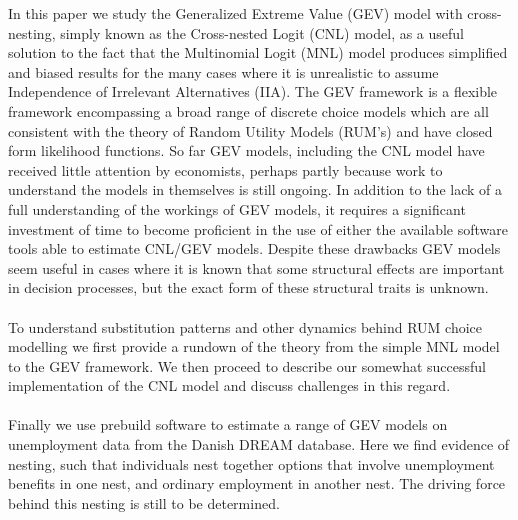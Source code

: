 In this paper we study the Generalized Extreme Value (GEV) model with cross-nesting, simply known as the Cross-nested Logit (CNL) model, as a useful solution to the fact that the Multinomial Logit (MNL) model produces simplified and biased results for the many cases where it is unrealistic to assume Independence of Irrelevant Alternatives (IIA). The GEV framework is a flexible framework encompassing a broad range of discrete choice models which are all consistent with the theory of Random Utility Models (RUM's) and have closed form likelihood functions. So far GEV models, including the CNL model have received little attention by economists, perhaps partly because work to understand the models in themselves is still ongoing. In addition to the lack of a full understanding of the workings of GEV models, it requires a significant investment of time to become proficient in the use of either the available software tools able to estimate CNL/GEV models. Despite these drawbacks GEV models seem useful in cases where it is known that some structural effects are important in decision processes, but the exact form of these structural traits is unknown. %
\\ \\
To understand substitution patterns and other dynamics behind RUM choice modelling we first provide a rundown of the theory from the simple MNL model to the GEV framework. We then proceed to describe our somewhat successful implementation of the CNL model and discuss challenges in this regard.
\\ \\
Finally we use prebuild software to estimate a range of GEV models on unemployment data from the Danish DREAM database. Here we find evidence of nesting, such that individuals nest together options that involve unemployment benefits in one nest, and ordinary employment in another nest. The driving force behind this nesting is still to be determined.


